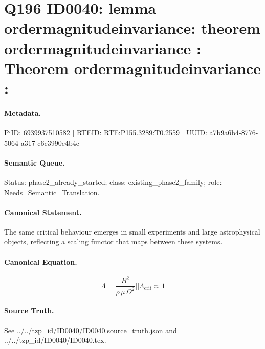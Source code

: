 \section*{Q196 ID0040: lemma ordermagnitudeinvariance: theorem ordermagnitudeinvariance : Theorem ordermagnitudeinvariance :}
\paragraph{Metadata.}
PiID: 6939937510582 | RTEID: RTE:P155.3289:T0.2559 | UUID: a7b9a6b4-8776-5064-a317-c6c3990e4b4c

\paragraph{Semantic Queue.}
Status: phase2\_already\_started; class: existing\_phase2\_family; role: Needs\_Semantic\_Translation.

\paragraph{Canonical Statement.}
The same critical behaviour emerges in small experiments and large astrophysical objects, reflecting a scaling functor that maps between these systems.

\paragraph{Canonical Equation.}
\[
\Lambda = \frac{B^{2}}{\rho\,\mu\,\Omega^{2}} || \Lambda_{\mathrm{crit}} \approx 1
\]

\paragraph{Source Truth.}
See ../../tzp\_id/ID0040/ID0040.source\_truth.json and ../../tzp\_id/ID0040/ID0040.tex.
